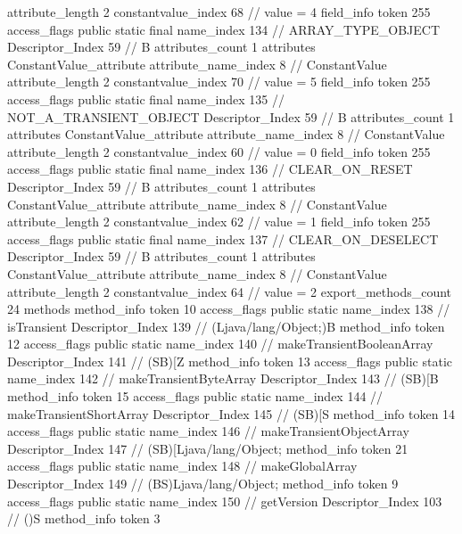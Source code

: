 {{{{{{{					attribute_length	2
					constantvalue_index	68		// value = 4
				}
				}
			}
			field_info {
				token	255
				access_flags	public static final
				name_index	134		// ARRAY_TYPE_OBJECT
				Descriptor_Index	59		// B
				attributes_count	1
				attributes {
				ConstantValue_attribute {
					attribute_name_index	8		// ConstantValue
					attribute_length	2
					constantvalue_index	70		// value = 5
				}
				}
			}
			field_info {
				token	255
				access_flags	public static final
				name_index	135		// NOT_A_TRANSIENT_OBJECT
				Descriptor_Index	59		// B
				attributes_count	1
				attributes {
				ConstantValue_attribute {
					attribute_name_index	8		// ConstantValue
					attribute_length	2
					constantvalue_index	60		// value = 0
				}
				}
			}
			field_info {
				token	255
				access_flags	public static final
				name_index	136		// CLEAR_ON_RESET
				Descriptor_Index	59		// B
				attributes_count	1
				attributes {
				ConstantValue_attribute {
					attribute_name_index	8		// ConstantValue
					attribute_length	2
					constantvalue_index	62		// value = 1
				}
				}
			}
			field_info {
				token	255
				access_flags	public static final
				name_index	137		// CLEAR_ON_DESELECT
				Descriptor_Index	59		// B
				attributes_count	1
				attributes {
				ConstantValue_attribute {
					attribute_name_index	8		// ConstantValue
					attribute_length	2
					constantvalue_index	64		// value = 2
				}
				}
			}
			}
			export_methods_count	24
			methods {
				method_info {
					token	10
					access_flags	public static
					name_index	138		// isTransient
					Descriptor_Index	139		// (Ljava/lang/Object;)B
				}
				method_info {
					token	12
					access_flags	public static
					name_index	140		// makeTransientBooleanArray
					Descriptor_Index	141		// (SB)[Z
				}
				method_info {
					token	13
					access_flags	public static
					name_index	142		// makeTransientByteArray
					Descriptor_Index	143		// (SB)[B
				}
				method_info {
					token	15
					access_flags	public static
					name_index	144		// makeTransientShortArray
					Descriptor_Index	145		// (SB)[S
				}
				method_info {
					token	14
					access_flags	public static
					name_index	146		// makeTransientObjectArray
					Descriptor_Index	147		// (SB)[Ljava/lang/Object;
				}
				method_info {
					token	21
					access_flags	public static
					name_index	148		// makeGlobalArray
					Descriptor_Index	149		// (BS)Ljava/lang/Object;
				}
				method_info {
					token	9
					access_flags	public static
					name_index	150		// getVersion
					Descriptor_Index	103		// ()S
				}
				method_info {
					token	3
}}}}}
